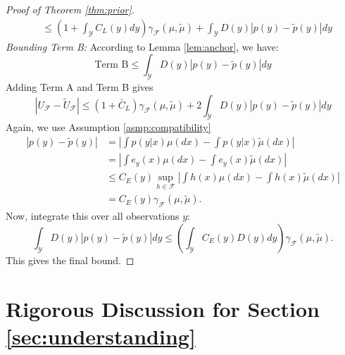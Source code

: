 \documentclass[twoside,11pt]{article}
\begin{document}
\begin{proof}[Proof of Theorem \ref{thm:prior}]
\begin{align*}
    & \le (1 + \int_{\mathcal{Y}} C_L(y) dy) \gamma_{\mathcal{F}}(\mu, \tilde{\mu}) + \int_{\mathcal{Y}} D(y) |p(y) - \tilde{p}(y)| dy
    \end{align*}
    \textit{Bounding Term B:} According to Lemma \ref{lem:anchor}, we have:
    $$\text{Term B} \le \int_{\mathcal{Y}} D(y)|p(y) - \tilde{p}(y)| dy$$
    Adding Term A and Term B gives
    $$ |U_{\mathcal{F}} - \tilde{U}_{\mathcal{F}}| \le (1 + \bar{C}_L) \gamma_{\mathcal{F}}(\mu, \tilde{\mu}) + 2 \int_{\mathcal{Y}} D(y)|p(y) - \tilde{p}(y)| dy $$
    Again, we use Assumption \ref{asmp:compatibility}
    \begin{align*}
    |p(y) - \tilde{p}(y)| &= \left| \int p(y|x) \mu(dx) - \int p(y|x) \tilde{\mu}(dx) \right| \\
    &=\left| \int e_y(x) \mu(dx) - \int e_y(x) \tilde{\mu}(dx) \right| \\
    &\le C_E(y) \sup_{h \in \mathcal{F}} \left| \int h(x) \mu(dx) - \int h(x) \tilde{\mu}(dx) \right| \\
    &= C_E(y) \gamma_{\mathcal{F}}(\mu, \tilde{\mu}).
    \end{align*}
    Now, integrate this over all observations $y$:
    $$\int_{\mathcal{Y}} D(y)|p(y) - \tilde{p}(y)| dy \le \left( \int_{\mathcal{Y}} C_E(y)D(y) dy \right) \gamma_{\mathcal{F}}(\mu, \tilde{\mu}).$$
    This gives the final bound. 
\end{proof}

\section{Rigorous Discussion for Section \ref{sec:understanding}}
\label{sec:math_understanding}
\end{document}

